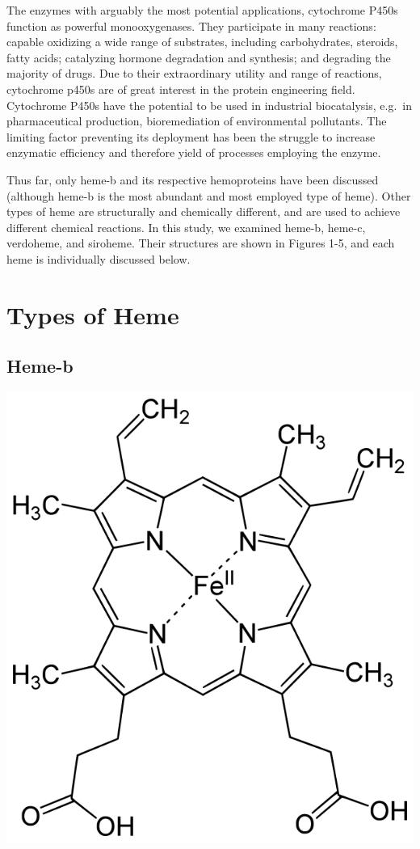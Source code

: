 \documentclass[a4paper, nobind]{templates/ociamthesis}
\let\origfigure\figure
\let\endorigfigure\endfigure
\renewenvironment{figure}[1][2] {
    \expandafter\origfigure\expandafter[H]
} {
    \endorigfigure
}
\begin{document}
The enzymes with arguably the most potential applications, cytochrome P450s function as powerful monooxygenases. They participate in many reactions: capable oxidizing a wide range of substrates, including carbohydrates, steroids, fatty acids; catalyzing hormone degradation and synthesis; and degrading the majority of drugs\autocite{Poulos2014}. Due to their extraordinary utility and range of reactions, cytochrome p450s are of great interest in the protein engineering field. Cytochrome P450s have the potential to be used in industrial biocatalysis, e.g.~in pharmaceutical production, bioremediation of environmental pollutants\autocite{Du2017,Lalonde2016}. The limiting factor preventing its deployment has been the struggle to increase enzymatic efficiency and therefore yield of processes employing the enzyme\autocite{Girvan2016,Li2020}.

Thus far, only heme-b and its respective hemoproteins have been discussed (although heme-b is the most abundant and most employed type of heme). Other types of heme are structurally and chemically different, and are used to achieve different chemical reactions. In this study, we examined heme-b, heme-c, verdoheme, and siroheme. Their structures are shown in Figures 1-5, and each heme is individually discussed below.

\hypertarget{types-of-heme}{%
\section{Types of Heme}\label{types-of-heme}}

\hypertarget{heme-b}{%
\subsection{Heme-b}\label{heme-b}}

\begin{figure}

{\centering \includegraphics[width=0.5\linewidth]{figures/HEM} 

}

\caption{Heme-b (HEM)}\label{fig:structHEM}
\end{figure}
\end{document}
